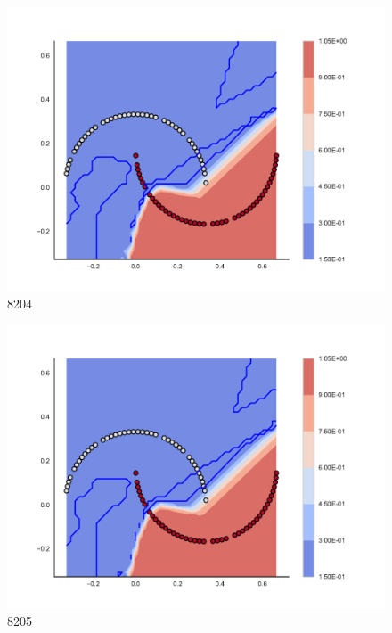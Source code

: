 \begin{subfigure}[b]{0.09\textwidth}
    \includegraphics[clip, trim=2.35cm 1.75cm 4.5cm 0cm,width=\textwidth]{img/convergence/8204.pdf}
    \caption{8204}
    \label{fig:convergence_8204}
\end{subfigure}
%
\begin{subfigure}[b]{0.09\textwidth}
    \includegraphics[clip, trim=2.35cm 1.75cm 4.5cm 0cm,width=\textwidth]{img/convergence/8205.pdf}
    \caption{8205}
    \label{fig:convergence_8205}
\end{subfigure}
%
